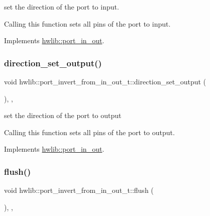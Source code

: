 set the direction of the port to input.

Calling this function sets all pins of the port to input. 

Implements \hyperlink{classhwlib_1_1port__in__out_ac7a9611410ddb9fd5d8e2dd15bff0a3f}{hwlib\+::port\+\_\+in\+\_\+out}.

\mbox{\label{classhwlib_1_1port__invert__from__in__out__t_a081fcd37931c8b02a8bcc61899ea5346}} 
\subsubsection{\texorpdfstring{direction\+\_\+set\+\_\+output()}{direction\_set\_output()}}
{\footnotesize\ttfamily void hwlib\+::port\+\_\+invert\+\_\+from\+\_\+in\+\_\+out\+\_\+t\+::direction\+\_\+set\+\_\+output (\begin{DoxyParamCaption}{ }\end{DoxyParamCaption})\hspace{0.3cm}{\ttfamily [inline]}, {\ttfamily [override]}, {\ttfamily [virtual]}}

set the direction of the port to output

Calling this function sets all pins of the port to output. 

Implements \hyperlink{classhwlib_1_1port__in__out_a515b4a6bbde4f2df5bb11cda41234fe4}{hwlib\+::port\+\_\+in\+\_\+out}.

\mbox{\label{classhwlib_1_1port__invert__from__in__out__t_a9066c534e517baf82995863bb67cb443}} 
\subsubsection{\texorpdfstring{flush()}{flush()}}
{\footnotesize\ttfamily void hwlib\+::port\+\_\+invert\+\_\+from\+\_\+in\+\_\+out\+\_\+t\+::flush (\begin{DoxyParamCaption}{ }\end{DoxyParamCaption})\hspace{0.3cm}{\ttfamily [inline]}, {\ttfamily [override]}, {\ttfamily [virtual]}}

